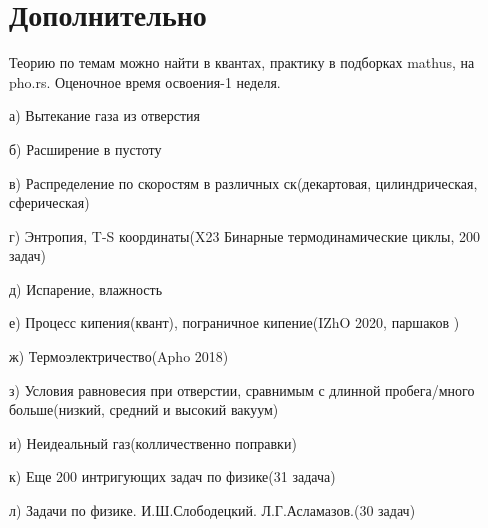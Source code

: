 \documentclass{article}
\begin{document}
\Large\section{Дополнительно}
\large{
Теорию по темам можно найти в квантах, практику в подборках mathus, на pho.rs. Оценочное время освоения-1 неделя.

а) Вытекание газа из отверстия

б) Расширение в пустоту

в) Распределение по скоростям в различных ск(декартовая, цилиндрическая, сферическая)

г) Энтропия, T-S координаты(X23 Бинарные термодинамические циклы, 200 задач)

д) Испарение, влажность

е) Процесс кипения(квант), пограничное кипение(IZhO 2020, паршаков )

ж) Термоэлектричество(Apho 2018)

з) Условия равновесия при отверстии, сравнимым с длинной пробега/много больше(низкий, средний и высокий вакуум)

и) Неидеальный газ(колличественно поправки)

к) Еще 200 интригующих задач по физике(31 задача)

л) Задачи по физике. И.Ш.Слободецкий. Л.Г.Асламазов.(30 задач)
}
\end{document}
